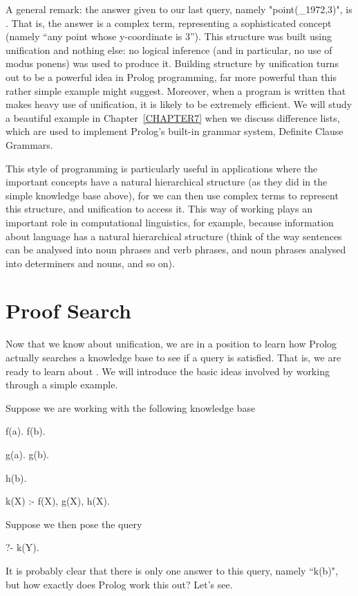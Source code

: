 A general remark: the answer given to our last query, namely
"point(\_1972,3)", is . That is, the answer is a
complex term, representing a sophisticated concept (namely ``any point
whose y-coordinate is 3''). This structure was built using unification
and nothing else: no logical inference (and in particular, no use of
modus ponens) was used to produce it.  Building structure by
unification turns out to be a powerful idea in Prolog programming, far
more powerful than this rather simple example might suggest.
Moreover, when a program is written that makes heavy use of
unification, it is likely to be extremely efficient. We will study a
beautiful example in Chapter~\ref{CHAPTER7} when we discuss difference
lists, which are used to implement Prolog's built-in grammar system,
Definite Clause Grammars.

This style of programming is particularly useful in applications where
the important concepts have a natural hierarchical structure (as they
did in the simple knowledge base above), for we can then use complex
terms to represent this structure, and unification to access it.  This
way of working plays an important role in computational linguistics,
for example, because information about language has a natural
hierarchical structure (think of the way sentences can be analysed
into noun phrases and verb phrases, and noun phrases analysed into
determiners and nouns, and so on).



\section{Proof Search}\label{SEC.L2.PROOFSEARCH}

Now that we know about unification, we are in a position to learn how
Prolog actually searches a knowledge base to see if a query is
satisfied. That is, we are  ready to learn about .  We will introduce the basic ideas involved by working
through a simple example.

Suppose we are working with the following knowledge base
\begin{LPNcodedisplay}
f(a).
f(b).

g(a).
g(b).

h(b).

k(X) :- f(X), g(X), h(X).
\end{LPNcodedisplay}
%
Suppose we  then pose the query
\begin{LPNcodedisplay}
?- k(Y).
\end{LPNcodedisplay}
%
It is probably clear that there is only one answer to this query,
namely ``k(b)", but how exactly does Prolog work this out? Let's see.

